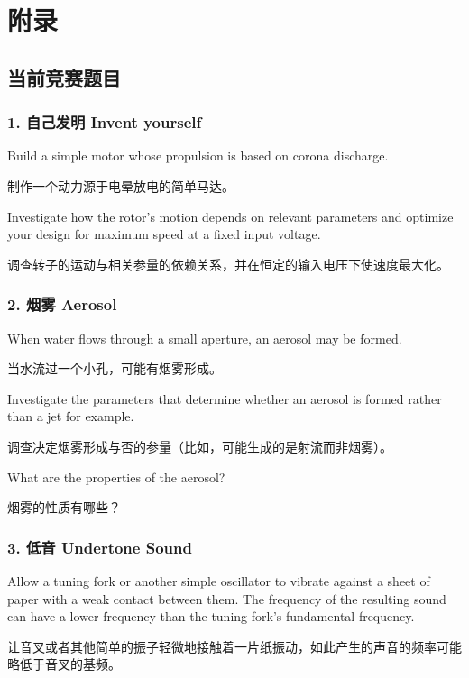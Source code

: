 \documentclass[a4paper,10pt,english]{sphinxmanual}
\begin{document}
\chapter{附录}
\label{\detokenize{7. Appendix::doc}}\label{\detokenize{7. Appendix:id1}}

\section{当前竞赛题目}
\label{\detokenize{7. Appendix:id2}}

\subsection{1. 自己发明 Invent yourself}
\label{\detokenize{7. Appendix:invent-yourself}}
Build a simple motor whose propulsion is based on corona discharge.

制作一个动力源于电晕放电的简单马达。

Investigate how the rotor’s motion depends on relevant parameters and optimize your design for maximum speed at a fixed input voltage.

调查转子的运动与相关参量的依赖关系，并在恒定的输入电压下使速度最大化。


\subsection{2. 烟雾 Aerosol}
\label{\detokenize{7. Appendix:aerosol}}
When water flows through a small aperture, an aerosol may be formed.

当水流过一个小孔，可能有烟雾形成。

Investigate the parameters that determine whether an aerosol is formed rather than a jet for example.

调查决定烟雾形成与否的参量（比如，可能生成的是射流而非烟雾）。

What are the properties of the aerosol?

烟雾的性质有哪些？


\subsection{3. 低音 Undertone Sound}
\label{\detokenize{7. Appendix:undertone-sound}}
Allow a tuning fork or another simple oscillator to vibrate against a sheet of paper with a weak contact between them. The frequency of the resulting sound can have a lower frequency than the tuning fork’s fundamental frequency.

让音叉或者其他简单的振子轻微地接触着一片纸振动，如此产生的声音的频率可能略低于音叉的基频。
\end{document}
